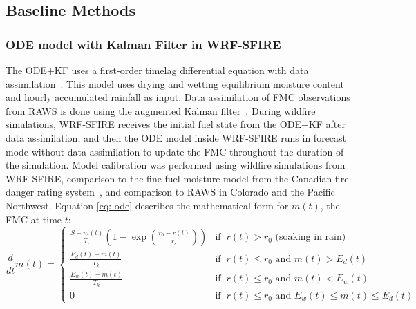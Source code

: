 \documentclass[fire,article,submit,pdftex,moreauthors]{Definitions/mdpi}
\begin{document}
\subsection{Baseline Methods}
\label{subsec:baseline}

\subsubsection{ODE model with Kalman Filter in WRF-SFIRE}
\label{sec:ODE_KF}
The ODE+KF uses a first-order timelag differential equation with data assimilation~\citep{Mandel-2014-RAA, Vejmelka-2016-DAD}. This model uses drying and wetting equilibrium moisture content and hourly accumulated rainfall as input. Data assimilation of FMC observations from RAWS is done using the augmented Kalman filter~\citep{Vejmelka-2016-DAD}. During wildfire simulations, WRF-SFIRE receives the initial fuel state from the ODE+KF after data assimilation, and then the ODE model inside WRF-SFIRE runs in forecast mode without data assimilation to update the FMC throughout the duration of the simulation. Model calibration was performed using wildfire simulations from WRF-SFIRE, comparison to the fine fuel moisture model from the Canadian fire danger rating system~\citep{VanWagner-1985-EFP}, and comparison to RAWS in Colorado and the Pacific Northwest. Equation \ref{eq: ode} describes the mathematical form for $m(t)$, the FMC at time $t$:
\begin{equation}
\label{eq: ode}
    \frac{d}{dt}m(t) = \begin{cases}
        \frac{S-m(t)}{T_r}\left(1-\exp\left(\frac{r_0 - r(t)}{r_s}\right)\right) & \text{if}\;\; r(t) > r_0 \text{ (soaking in rain)}\\
        \frac{E_d(t)-m(t)}{T_k} & \text{if}\;\; r(t)\leq r_0 \text{ and }m(t)>E_d(t)\\
        \frac{E_w(t)-m(t)}{T_k} & \text{if}\;\; r(t)\leq r_0 \text{ and } m(t)<E_w(t)\\
        0 & \text{if}\;\; r(t)\leq r_0 \text{ and } E_w(t)\leq m(t)\leq E_d(t)
    \end{cases}
\end{equation}
\end{document}
